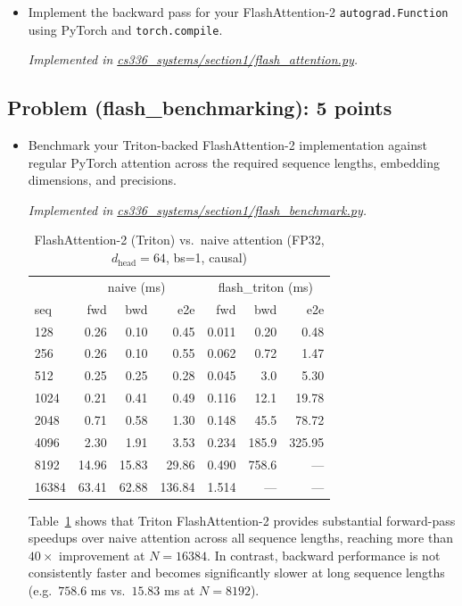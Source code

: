 \documentclass[letterpaper]{article}
\newcommand{\repofile}[2]{\href{https://github.com/echung32/ece405-assignment4-hpc/blob/main/#1}{#2}}
\begin{document}
	\begin{itemize}
		\item[(a)] Implement the backward pass for your FlashAttention-2 \texttt{autograd.Function} using PyTorch and \texttt{torch.compile}.
		
		\textit{Implemented in \repofile{cs336_systems/section1/flash_attention.py}{cs336\_systems/section1/flash\_attention.py}.}
	\end{itemize}
	
	\subsection{Problem (flash\_benchmarking): 5 points}
	
	\begin{itemize}
		\item[(a)] Benchmark your Triton-backed FlashAttention-2 implementation against regular PyTorch attention across the required sequence lengths, embedding dimensions, and precisions.
		
		\textit{Implemented in \repofile{cs336_systems/section1/flash_benchmark.py}{cs336\_systems/section1/flash\_benchmark.py}.}
		
		\begin{table}[H]
			\centering
			\caption{FlashAttention-2 (Triton) vs.\ naive attention (FP32, $d_{\text{head}}=64$, bs=1, causal)}
			\label{tab:flash-bench}
			\begin{tabular}{lrrr|rrr}
				\hline
				& \multicolumn{3}{c|}{naive (ms)} & \multicolumn{3}{c}{flash\_triton (ms)} \\
				seq & fwd & bwd & e2e & fwd & bwd & e2e \\
				\hline
				128   &  0.26 &  0.10 &  0.45 &  0.011 &   0.20 &   0.48 \\
				256   &  0.26 &  0.10 &  0.55 &  0.062 &   0.72 &   1.47 \\
				512   &  0.25 &  0.25 &  0.28 &  0.045 &   3.0  &   5.30 \\
				1024  &  0.21 &  0.41 &  0.49 &  0.116 &  12.1  &  19.78 \\
				2048  &  0.71 &  0.58 &  1.30 &  0.148 &  45.5  &  78.72 \\
				4096  &  2.30 &  1.91 &  3.53 &  0.234 & 185.9  & 325.95 \\
				8192  & 14.96 & 15.83 & 29.86 &  0.490 & 758.6  &    --- \\
				16384 & 63.41 & 62.88 &136.84 &  1.514 &    --- &    --- \\
				\hline
			\end{tabular}
		\end{table}
		
		Table~\ref{tab:flash-bench} shows that Triton FlashAttention-2 provides substantial forward-pass speedups over naive attention across all sequence lengths, reaching more than \(40\times\) improvement at \(N=16384\). In contrast, backward performance is not consistently faster and becomes significantly slower at long sequence lengths (e.g.\ \(758.6\) ms vs.\ \(15.83\) ms at \(N=8192\)).
	\end{itemize}
	
\end{document}
